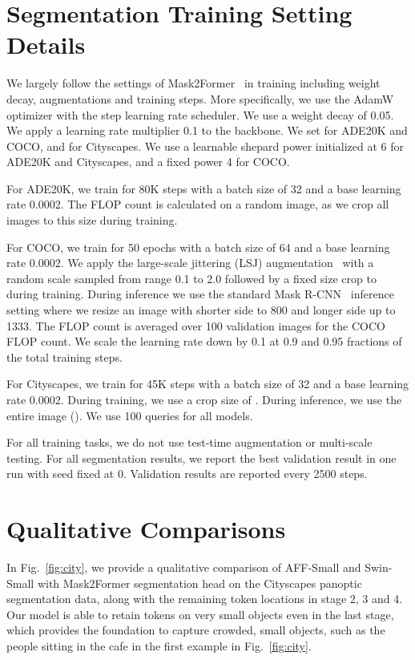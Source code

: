 \documentclass[10pt,twocolumn,letterpaper]{article}
\begin{document}
\section{Segmentation Training Setting Details}\label{sec:setting}
We largely follow the settings of Mask2Former~\cite{mask2} in training including weight decay, augmentations and training steps. 
More specifically, we use the AdamW~\cite{adamw} optimizer with the step learning rate scheduler. We use a weight decay of 0.05. We apply a learning rate multiplier 0.1 to the backbone. We set  for ADE20K and COCO, and  for Cityscapes. We use a learnable shepard power initialized at 6 for ADE20K and Cityscapes, and a fixed power 4 for COCO.

For ADE20K, we train for 80K steps with a batch size of 32 and a base learning rate 0.0002. The FLOP count is calculated on a random  image, as we crop all images to this size during training.

For COCO, we train for 50 epochs with a batch size of 64 and a base learning rate 0.0002. We apply the large-scale jittering (LSJ) augmentation~\cite{du2021simple, simplycopy} with a random scale sampled from range 0.1 to 2.0 followed by a fixed size crop to  during training. During inference we use the standard Mask R-CNN~\cite{maskrcnn} inference setting where we resize an image with shorter side to 800 and longer side up to 1333. The FLOP count is averaged over 100 validation images for the COCO FLOP count. We scale the learning rate down by 0.1 at 0.9 and 0.95 fractions of the total training steps.

For Cityscapes, we train for 45K steps with a batch size of 32 and a base learning rate 0.0002. During training, we use a crop size of . During inference, we use the entire image (). We use 100 queries for all models.


For all training tasks, we do not use test-time augmentation or multi-scale testing. For all segmentation results, we report the best validation result in one run with seed fixed at 0. Validation results are reported every 2500 steps.

\section{Qualitative Comparisons}

In Fig.~\ref{fig:city}, we provide a qualitative comparison of AFF-Small and Swin-Small with Mask2Former segmentation head on the Cityscapes panoptic segmentation data, along with the remaining token locations in stage 2, 3 and 4. Our model is able to retain tokens on very small objects even in the last stage, which provides the foundation to capture crowded, small objects, such as the people sitting in the cafe in the first example in Fig.~\ref{fig:city}.
\end{document}
